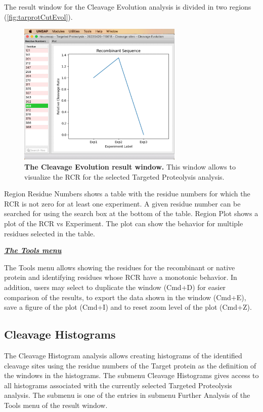 The result window for the Cleavage Evolution analysis is divided in two regions
(\autoref{fig:tarprotCutEvol}).

\begin{figure}[h]
    \centering
    \includegraphics[width=0.7\textwidth]{./IMAGES/MOD-TARPROT/tarprot-cutevol.jpg}
    \caption[The Cleavage Evolution result window]{\textbf{The Cleavage Evolution
    result window.} This window allows to visualize the RCR for the selected Targeted
    Proteolysis analysis.}
    \label{fig:tarprotCutEvol}
    \vspace{-5pt}
\end{figure}

Region Residue Numbers shows a table with the residue numbers for which the RCR is
not zero for at least one experiment. A given residue number can be searched for using
the search box at the bottom of the table. Region Plot shows a plot of the RCR vs Experiment.
The plot can show the behavior for multiple residues selected in the table.

\textit{\textbf{\underline{The Tools menu}}}

The Tools menu allows showing the residues for the recombinant or native protein
and identifying residues whose RCR have a monotonic behavior. In addition,
users may select to duplicate the window (Cmd+D) for easier comparison of the results,
to export the data shown in the window (Cmd+E), save a figure of the plot (Cmd+I)
and to reset zoom level of the plot (Cmd+Z).

\subsection{Cleavage Histograms}
\label{subsec:tarprotHist}
The Cleavage Histogram analysis allows creating histograms of the identified cleavage
sites using the residue numbers of the Target protein as the definition of the windows
in the histograms. The submenu Cleavage Histograms gives access to all histograms
associated with the currently selected Targeted Proteolysis analysis. The submenu
is one of the entries in submenu Further Analysis of the Tools menu of the result window.

